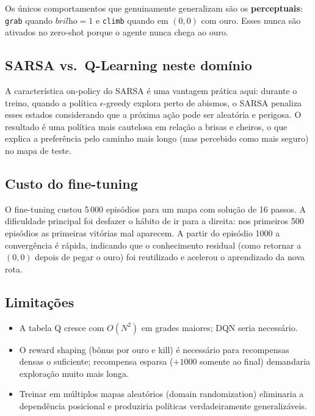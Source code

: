 \documentclass[11pt,a4paper]{article}
\begin{document}
Os \'unicos comportamentos que genuinamente generalizam s\~ao os \textbf{perceptuais}: \texttt{grab}
quando $\textit{brilho}=1$ e \texttt{climb} quando em $(0,0)$ com ouro. Esses nunca s\~ao ativados no zero-shot porque o agente nunca chega ao ouro.

\subsection{SARSA vs.\ Q-Learning neste dom\'inio}

A caracter\'istica on-policy do SARSA \'e uma vantagem pr\'atica aqui: durante o treino,
quando a pol\'itica $\epsilon$-greedy explora perto de abismos, o SARSA penaliza esses estados
considerando que a pr\'oxima a\c{c}\~ao pode ser aleat\'oria e perigosa. O resultado \'e uma pol\'itica
mais cautelosa em rela\c{c}\~ao a brisas e cheiros, o que explica a prefer\^encia pelo caminho mais
longo (mas percebido como mais seguro) no mapa de teste.

\subsection{Custo do fine-tuning}

O fine-tuning custou 5\,000 epis\'odios para um mapa com solu\c{c}\~ao de 16 passos. A dificuldade principal foi desfazer o h\'abito de ir para a direita: nos primeiros 500 epis\'odios
as primeiras vit\'orias mal aparecem. A partir do epis\'odio 1000 a converg\^encia \'e r\'apida,
indicando que o conhecimento residual (como retornar a $(0,0)$ depois de pegar o ouro) foi
reutilizado e acelerou o aprendizado da nova rota.

\subsection{Limita\c{c}\~oes}

\begin{itemize}
  \item A tabela Q cresce com $O(N^2)$ em grades maiores; DQN seria necess\'ario.
  \item O reward shaping (b\^onus por ouro e kill) \'e necess\'ario para recompensas densas
  o suficiente; recompensa esparsa ($+1000$ somente ao final) demandaria explora\c{c}\~ao
  muito mais longa.
  \item Treinar em m\'ultiplos mapas aleat\'orios (domain randomization) eliminaria a depend\^encia posicional e produziria pol\'iticas verdadeiramente generaliz\'aveis.
\end{itemize}
\end{document}
